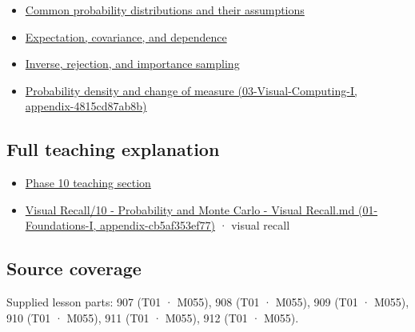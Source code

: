 \begin{itemize}
\tightlist
\item
  \hyperref[appendix-a2360b435383]{Common probability distributions and their assumptions}
\item
  \hyperref[appendix-54c383df9992]{Expectation, covariance, and dependence}
\item
  \hyperref[appendix-8d863ed954d0]{Inverse, rejection, and importance sampling}
\item
  \href{../03-Visual-Computing-I/main.pdf\#nameddest=appendix-4815cd87ab8b}{Probability density and change of measure (03-Visual-Computing-I, appendix-4815cd87ab8b)}
\end{itemize}

\subsection{Full teaching explanation}\label{appendix-4d0203f7944f-full-teaching-explanation}

\begin{itemize}
\tightlist
\item
  \hyperref[02-foundations-ii-ch023-random-quantities-and-their-probability-laws]{Phase 10 teaching section}
\item
  \href{../01-Foundations-I/main.pdf\#nameddest=appendix-cb5af353ef77}{Visual Recall/10 - Probability and Monte Carlo - Visual Recall.md (01-Foundations-I, appendix-cb5af353ef77)} · visual recall
\end{itemize}

\subsection{Source coverage}\label{appendix-4d0203f7944f-source-coverage}

Supplied lesson parts: 907 (T01 · M055), 908 (T01 · M055), 909 (T01 · M055), 910 (T01 · M055), 911 (T01 · M055), 912 (T01 · M055).

